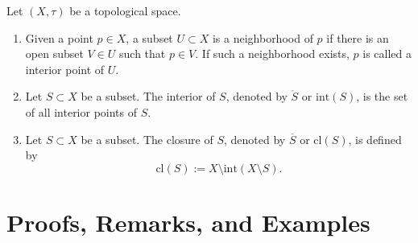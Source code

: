 \begin{defbox}
    \begin{definition}
        Let \((X, \tau)\) be a topological space.
        \begin{enumerate}
            \item Given a {\color{mathobj}point} \(p \in X\), a subset \(U \subset X\) is a neighborhood of \(p\) if there is an open subset \(V \in U\) such that \(p \in V\). If such a neighborhood exists, \(p\) is called a interior point of \(U\).
            \item Let \(S \subset X\) be a subset. The interior of \(S\), denoted by \(\mathring{S}\) or \(\mathrm{int}(S)\), is the {\color{mathobj}set} of all interior points of \(S\).
            \item Let \(S \subset X\) be a subset. The closure of \(S\), denoted by \(\overline{S}\) or \(\mathrm{cl}(S)\), is defined by
            \begin{equation*}
                \mathrm{cl}(S) := X \setminus \mathrm{int}(X \setminus S) \text{.}
            \end{equation*}
        \end{enumerate}
    \end{definition}
\end{defbox}
\newpage
\section{Proofs, Remarks, and Examples}

